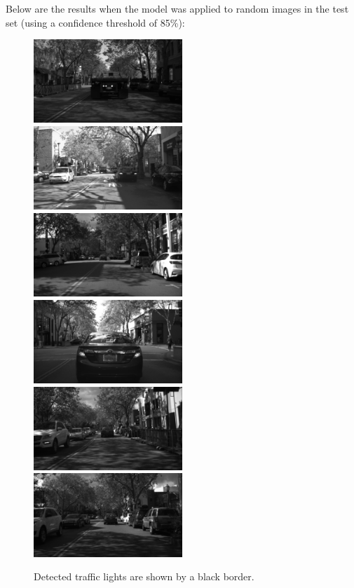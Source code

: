 \documentclass[a4paper]{article}
\begin{document}
 Below are the results when the model was applied to random images in the test set (using a confidence threshold of 85\%):
\begin{figure}[!htb]
\centering
\includegraphics[width=0.5\textwidth]{25430.png}
\includegraphics[width=0.5\textwidth]{28028.png}
\includegraphics[width=0.5\textwidth]{38314.png}
\includegraphics[width=0.5\textwidth]{37750.png}
\includegraphics[width=0.5\textwidth]{39580.png}
\includegraphics[width=0.5\textwidth]{39696.png}
    \caption{\label{fig:masks} Detected traffic lights are shown by a black border.}
\end{figure}
\end{document}
